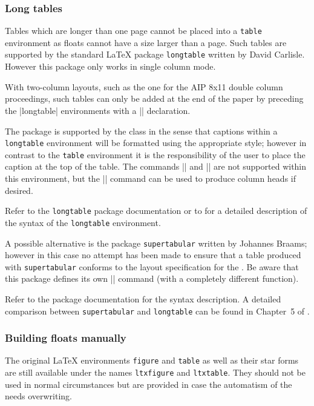 \subsubsection{Long tables}

Tables which are longer than one page cannot be placed into a
\texttt{table} environment as floats cannot have a size larger than a
page. Such tables are supported by the standard \LaTeX{} package
\texttt{longtable} written by David Carlisle. However this package
only works in single column mode.

With two-column layouts, such as the one for the AIP 8x11 double
column proceedings, such tables can only be added at the end of the
paper by preceding the |longtable| environments with a |\onecolumn|
declaration.

The package is supported by the class in the sense that captions
within a \texttt{longtable} environment will be formatted using the
appropriate style; however in contrast to the \texttt{table}
environment it is the responsibility of the user to place the caption
at the top of the table. The commands |\source| and |\tablenote| are
not supported within this environment, but the |\tablehead| command
can be used to produce column heads if desired.

Refer to the \texttt{longtable} package documentation or to
\cite[p.122ff]{A-W:LLa94} for a detailed description of the syntax of
the \texttt{longtable} environment.

A possible alternative is the package \texttt{supertabular} written by
Johannes Braams; however in this case no attempt has been made to
ensure that a table produced with \texttt{supertabular} conforms to
the layout specification for the \aipcls{}. Be aware that this package
defines its own |\tablehead| command (with a completely different
function).

Refer to the package documentation for the syntax description. A
detailed comparison between \texttt{supertabular} and
\texttt{longtable} can be found in Chapter~5 of \cite{A-W:LLa94}.

\subsubsection{Building floats manually}

The original \LaTeX{} environments \texttt{figure} and \texttt{table}
as well as their star forms are still available under the names
\texttt{ltxfigure} and \texttt{ltxtable}. They should not be used in
normal circumstances but are provided in case the automatism of
the \aipcls{} needs overwriting.

